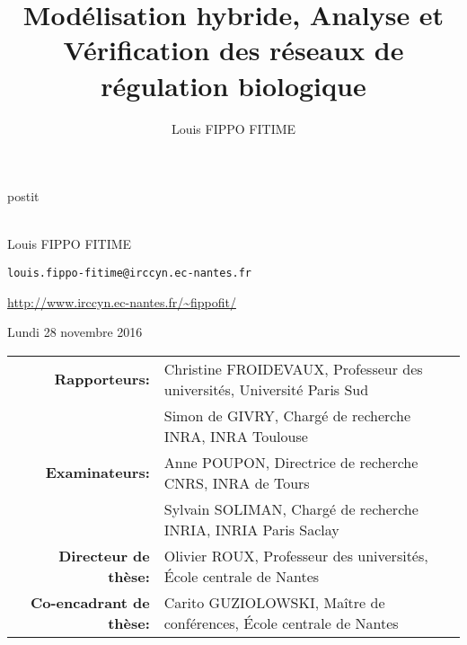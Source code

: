 \documentclass[fleqn,10pt,c]{beamer}
\date{\thedate}
\title[]{Modélisation hybride, Analyse et Vérification des réseaux de régulation biologique}
\author{Louis FIPPO FITIME}
\newcommand{\ex}[1]{\textcolor{couleurex}{#1}}
\newcommand{\tscite}[1]{\textcolor{couleurcit}{#1}}
\newcommand{\tcite}[1]{\tscite{[#1]}}
\newcommand{\tval}[1]{\textcolor{couleurex}{#1}}%
\begin{document}
\begin{frame}[plain,label=title]

\begin{center}
\vspace{1cm}
\begin{beamercolorbox}[sep=0.5em]{postit}
\centering
\Large
\textbf{%
{\normalsize\theconference{}}\\~\\%
\inserttitle
}
\end{beamercolorbox}

\par
\medskip
\normalsize
Louis FIPPO FITIME
\footnotesize

\texttt{louis.fippo-fitime@irccyn.ec-nantes.fr}

\url{http://www.irccyn.ec-nantes.fr/~fippofit/}

\normalsize
\bigskip
Lundi 28 novembre 2016

\medskip

{\scriptsize
\begin{tabular}{rl}
\textbf{Rapporteurs:} & Christine FROIDEVAUX, Professeur des universités, Université Paris Sud\\
                      & Simon de GIVRY, Chargé de recherche INRA, INRA Toulouse \\
\textbf{Examinateurs:} & Anne POUPON, Directrice de recherche CNRS, INRA de Tours\\
                      & Sylvain SOLIMAN, Chargé de recherche INRIA, INRIA Paris Saclay\\
                       
\textbf{Directeur de thèse:} & Olivier ROUX, Professeur des universités, \'Ecole centrale de Nantes\\
\textbf{Co-encadrant de thèse:} & Carito GUZIOLOWSKI, Maître de conférences, \'Ecole centrale de Nantes\\

\end{tabular}
}

\end{center}

\end{frame}





\newcommand{\citeegfra}{\quad\tval{\ex{egfr20}}: \tcite{Epidermal Growth Factor Receptor, by Özgür Sahin \textit{et al.}}}
\newcommand{\citeegfrb}{\quad\tval{\ex{egfr104}}: \tcite{Epidermal Growth Factor Receptor, by Regina Samaga \textit{et al.}}}
\newcommand{\citetcrsiga}{\quad\tval{\ex{tcrsig40}}: \tcite{T-Cell Receptor Signaling, by Steffen Klamt \textit{et al.}}}
\newcommand{\citetcrsigb}{\quad\tval{\ex{tcrsig94}}: \tcite{T-Cell Receptor Signaling, by Julio Saez-Rodriguez \textit{et al.}}}
\end{document}
